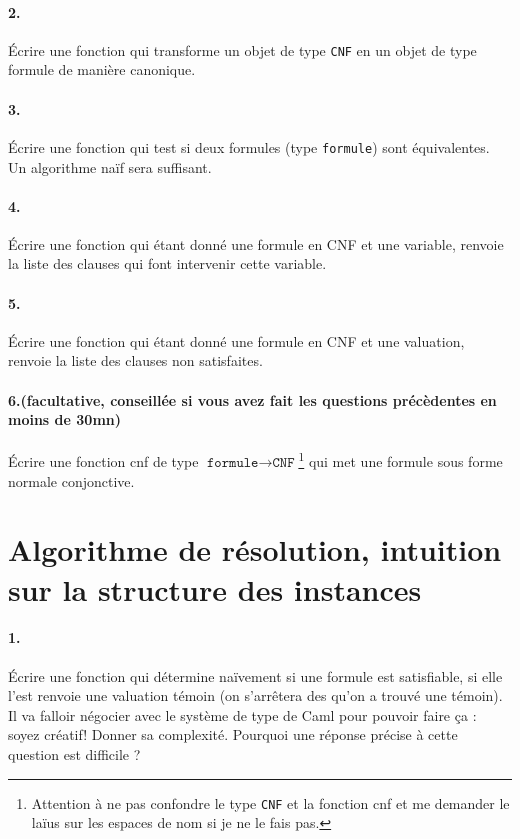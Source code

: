 \documentclass[10pt,a4paper]{article}
\begin{document}
\paragraph{2.} Écrire une fonction qui transforme un objet de type \texttt{CNF} en un objet de type formule de manière canonique. 

\paragraph{3.} Écrire une fonction qui test si deux formules (type \texttt{formule}) sont équivalentes. Un algorithme naïf sera suffisant.

\paragraph{4.} Écrire une fonction qui étant donné une formule en CNF et une variable, renvoie la liste des clauses qui font intervenir cette variable. 
\paragraph{5.} Écrire une fonction qui étant donné une formule en CNF et une valuation, renvoie la liste des clauses non satisfaites.

\paragraph{6.(facultative, conseillée si vous avez fait les questions précèdentes en moins de 30mn)} Écrire une fonction cnf de type $\texttt{formule} \rightarrow \texttt{CNF}$\footnote{Attention à ne pas confondre le type \texttt{CNF} et la fonction cnf et me demander le laïus sur les espaces de nom si je ne le fais pas.}  qui met une formule sous forme normale conjonctive.

\section{Algorithme de résolution, intuition sur la structure des instances}

\paragraph{1.} Écrire une fonction qui détermine naïvement si une formule est satisfiable, si elle l'est renvoie une valuation témoin (on s'arrêtera des qu'on a trouvé une témoin). Il va falloir négocier avec le système de type de Caml pour pouvoir faire ça : soyez créatif! Donner sa complexité. Pourquoi une réponse précise à cette question est difficile ? 
\end{document}
